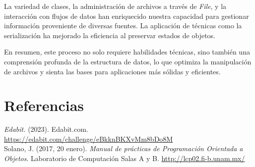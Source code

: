 \documentclass[11pt, twocolumn]{article}
\begin{document}
  La variedad de clases, la administración de archivos a través de \textit{File}, y la interacción con flujos de datos han enriquecido nuestra capacidad para gestionar información proveniente de diversas fuentes. La aplicación de técnicas como la serialización ha mejorado la eficiencia al preservar estados de objetos.

  En resumen, este proceso no solo requiere habilidades técnicas, sino también una comprensión profunda de la estructura de datos, lo que optimiza la manipulación de archivos y sienta las bases para aplicaciones más sólidas y eficientes.

  \section*{Referencias}
  \begin{small}
    \textit{Edabit.} (2023). Edabit.com. \url{https://edabit.com/challenge/eBkknBKXvMm8bDo8M} \\

    Solano, J. (2017, 20 enero). \textit{Manual de prácticas de Programación Orientada a Objetos}. Laboratorio de Computación Salas A y B. \url{http://lcp02.fi-b.unam.mx/} \\
  \end{small}
\end{document}
